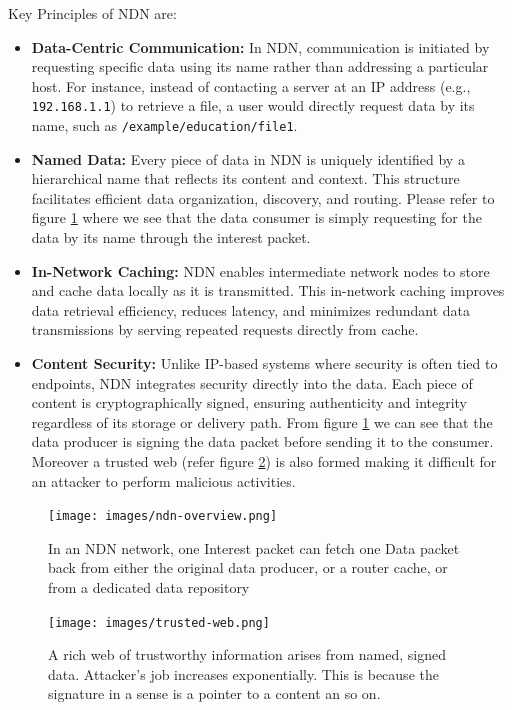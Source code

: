 \documentclass[conference]{IEEEtran}
\begin{document}
Key Principles of NDN are:
\begin{itemize}
    \item \textbf{Data-Centric Communication:} In NDN, communication is initiated by requesting specific data using its name rather than addressing a particular host. For instance, instead of contacting a server at an IP address (e.g., \texttt{192.168.1.1}) to retrieve a file, a user would directly request data by its name, such as \texttt{/example/education/file1}.
    \item \textbf{Named Data:} Every piece of data in NDN is uniquely identified by a hierarchical name that reflects its content and context. This structure facilitates efficient data organization, discovery, and routing. Please refer to figure \ref{fig:ndn-overview} where we see that the data consumer is simply requesting for the data by its name through the interest packet.
    \item \textbf{In-Network Caching:} NDN enables intermediate network nodes to store and cache data locally as it is transmitted. This in-network caching improves data retrieval efficiency, reduces latency, and minimizes redundant data transmissions by serving repeated requests directly from cache.
    \item \textbf{Content Security:} Unlike IP-based systems where security is often tied to endpoints, NDN integrates security directly into the data. Each piece of content is cryptographically signed, ensuring authenticity and integrity regardless of its storage or delivery path. From figure \ref{fig:ndn-overview} we can see that the data producer is signing the data packet before sending it to the consumer. Moreover a trusted web (refer figure \ref{fig:trusted-web}) is also formed making it difficult for an attacker to perform malicious activities.
\end{itemize}

\begin{figure}[htbp]
    \centering
    \texttt{[image: images/ndn-overview.png]}
    \caption{In an NDN network, one Interest packet can fetch one Data packet back from either the original data producer, or a router cache, or from a dedicated data repository\cite{ndn}}
    \label{fig:ndn-overview}
\end{figure}

\begin{figure}[htbp]
    \centering
    \texttt{[image: images/trusted-web.png]}
    \caption{A rich web of trustworthy information arises from named, signed data. Attacker’s job increases exponentially. This is because the signature in a sense is a pointer to a content an so on. \cite{ndn-presentation}}
    \label{fig:trusted-web}
\end{figure}
\end{document}
